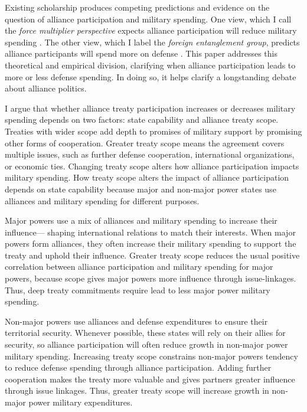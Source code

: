 \documentclass[12pt]{article}
\begin{document}
Existing scholarship produces competing predictions and evidence on the question of alliance participation and military spending. 
One view, which I call the \textit{force multiplier perspective} expects alliance participation will reduce military spending \citep{Morrow1993, Conybeare1994, DigiuseppePoast2016}. 
The other view, which I label the \textit{foreign entanglement group}, predicts alliance participants will spend more on defense \citep{Diehl1994, MorganPalmer2006}. 
This paper addresses this theoretical and empirical division, clarifying when alliance participation leads to more or less defense spending. 
In doing so, it helps clarify a longstanding debate about alliance politics.


I argue that whether alliance treaty participation increases or decreases military spending depends on two factors: state capability and alliance treaty scope. 
Treaties with wider scope add depth to promises of military support by promising other forms of cooperation.
Greater treaty scope means the agreement covers multiple issues, such as further defense cooperation, international organizations, or economic ties.  
Changing treaty scope alters how alliance participation impacts military spending. 
How treaty scope alters the impact of alliance participation depends on state capability because major and non-major power states use alliances and military spending for different purposes. 


Major powers use a mix of alliances and military spending to increase their influence--- shaping international relations to match their interests.
When major powers form alliances, they often increase their military spending to support the treaty and uphold their influence. 
Greater treaty scope reduces the usual positive correlation between alliance participation and military spending for major powers, because scope gives major powers more influence through issue-linkages.
Thus, deep treaty commitments require lead to less major power military spending.  


Non-major powers use alliances and defense expenditures to ensure their territorial security.
Whenever possible, these states will rely on their allies for security, so alliance participation will often reduce growth in non-major power military spending.   
Increasing treaty scope constrains non-major powers tendency to reduce defense spending through alliance participation. 
Adding further cooperation makes the treaty more valuable and gives partners greater influence through issue linkages. 
Thus, greater treaty scope will increase growth in non-major power military expenditures. 
\end{document}
